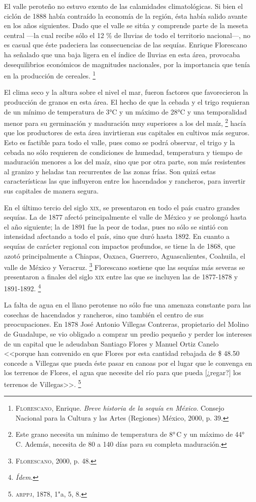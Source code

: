 \documentclass[14pt,twoside,final]{extbook} %
\let\oldfootnote\footnote
\renewcommand\footnote[1]{%
\oldfootnote{\hspace{1mm}#1}}
\begin{document}
El valle peroteño no estuvo exento de las calamidades climatológicas. Si bien el ciclón de 1888 había contraído la economía de la región, ésta había salido avante en los años siguientes. Dado que el valle se sitúa y comprende parte de la meseta central ---la cual recibe sólo el 12 \% de lluvias de todo el territorio nacional---, no es casual que éste padeciera las consecuencias de las sequías. Enrique Florescano ha señalado que una baja ligera en el índice de lluvias en esta área, provocaba desequilibrios económicos de magnitudes nacionales, por la importancia que tenía en la producción de cereales.\footnote{\textsc{Florescano}, Enrique. \emph{Breve historia de la sequía en México}. Consejo Nacional para la Cultura y las Artes (Regiones) México, 2000, p. 39.}

El clima seco y la altura sobre el nivel el mar, fueron factores que favorecieron la producción de granos en esta área. El hecho de que la cebada y el trigo requieran de un mínimo de temperatura de 3°C y un máximo de 28°C y una temporalidad menor para su germinación y maduración muy superiores a los del maíz,\footnote{Este grano necesita un mínimo de temperatura de 8°\,C y un máximo de 44°\,C. Además, necesita de 80 a 140 días para su completa maduración.} hacía que los productores de esta área invirtieran sus capitales en cultivos más seguros. Esto es factible para todo el valle, pues como se podrá observar, el trigo y la cebada no sólo requieren de condiciones de humedad, temperatura y tiempo de maduración menores a los del maíz, sino que por otra parte, son más resistentes al granizo y heladas tan recurrentes de las zonas frías. Son quizá estas características las que influyeron entre los hacendados y rancheros, para invertir sus capitales de manera segura.

En el último tercio del siglo \textsc{xix}, se presentaron en todo el país cuatro grandes sequías. La de 1877 afectó principalmente el valle de México y se prolongó hasta el año siguiente; la de 1891 fue la peor de todas, pues no sólo se sintió con intensidad afectando a todo el país, sino que duró hasta 1892. En cuanto a sequías de carácter regional con impactos profundos, se tiene la de 1868, que azotó principalmente a Chiapas, Oaxaca, Guerrero, Aguascalientes, Coahuila, el valle de México y Veracruz.\footnote{\textsc{Florescano}, 2000, p. 48.} Florescano sostiene que las sequías más severas se presentaron a finales del siglo \textsc{xix} entre las que se incluyen las de 1877-1878 y 1891-1892.\footnote{\em Ídem.}

La falta de agua en el llano perotense no sólo fue una amenaza constante para las cosechas de hacendados y rancheros, sino también el centro de sus preocupaciones. En 1878 José Antonio Villegas Contreras, propietario del Molino de Guadalupe, se vio obligado a comprar un predio pequeño y perder los intereses de un capital que le adeudaban Santiago Flores y Manuel Ortiz Canelo <<porque han convenido en que Flores por esta cantidad rebajada de \$ 48.50 concede a Villegas que pueda éste pasar en canoas por el lugar que le convenga en los terrenos de Flores, el agua que necesite del río para que pueda [¿regar?] los terrenos de Villegas>>.\footnote{\textsc{arppj}, 1878, 1"a, 5, 8.}
\end{document}
